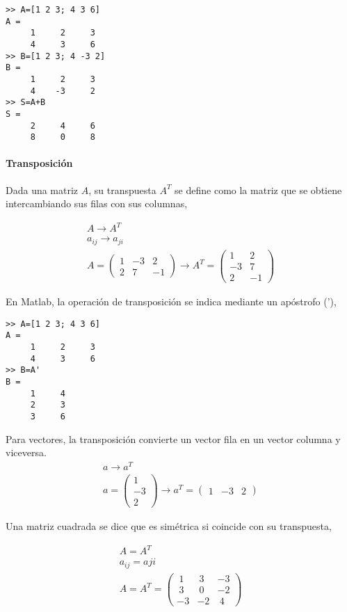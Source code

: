 \begin{verbatim}
>> A=[1 2 3; 4 3 6]
A =
     1     2     3
     4     3     6
>> B=[1 2 3; 4 -3 2]
B =
     1     2     3
     4    -3     2
>> S=A+B
S =
     2     4     6
     8     0     8
\end{verbatim}



\paragraph{Transposición}
Dada una matriz $A$, su transpuesta $A^T$ se define como la matriz que se obtiene intercambiando sus filas con sus columnas,

\begin{gather*}
A \rightarrow  A^T\\
a_{ij} \rightarrow  a_{ji}\\
A=
\begin{pmatrix}
1& -3& 2 \\
2& 7& -1
\end{pmatrix}  \rightarrow 
A^T=
\begin{pmatrix}
1& 2 \\
-3& 7\\
2 & -1
\end{pmatrix}
\end{gather*}

En Matlab, la operación de transposición se indica mediante un apóstrofo ('),

\begin{verbatim}
>> A=[1 2 3; 4 3 6]
A =
     1     2     3
     4     3     6
>> B=A'
B =
     1     4
     2     3
     3     6
\end{verbatim}

Para vectores, la transposición convierte un vector fila en un vector columna y viceversa. 
\begin{gather*}
a \rightarrow a^T\\
a=
\begin{pmatrix}
1 \\
-3\\
2 
\end{pmatrix}
 \rightarrow 
a^T=
\begin{pmatrix}
1& -3 & 2 
\end{pmatrix} 
\end{gather*}

Una matriz cuadrada se dice que es simétrica si coincide con su transpuesta,

\begin{gather*}
A=A^T\\
a_{ij}=a{ji}\\
A=A^T=
\begin{pmatrix}
\ 1&\ 3&-3\\
\ 3&\ 0&-2\\
-3&-2&\ 4
\end{pmatrix}
\end{gather*}

